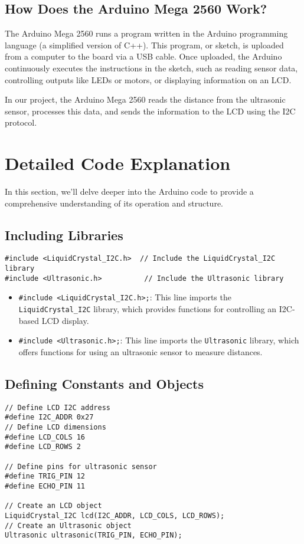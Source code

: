 \documentclass{article}
\begin{document}
\subsection{How Does the Arduino Mega 2560 Work?}
The Arduino Mega 2560 runs a program written in the Arduino programming language (a simplified version of C++). This program, or sketch, is uploaded from a computer to the board via a USB cable. Once uploaded, the Arduino continuously executes the instructions in the sketch, such as reading sensor data, controlling outputs like LEDs or motors, or displaying information on an LCD.

In our project, the Arduino Mega 2560 reads the distance from the ultrasonic sensor, processes this data, and sends the information to the LCD using the I2C protocol.
\section{Detailed Code Explanation}

In this section, we'll delve deeper into the Arduino code to provide a comprehensive understanding of its operation and structure.

\subsection{Including Libraries}

\begin{verbatim}
#include <LiquidCrystal_I2C.h>  // Include the LiquidCrystal_I2C library
#include <Ultrasonic.h>          // Include the Ultrasonic library
\end{verbatim}

\begin{itemize}
    \item \texttt{\#include <LiquidCrystal\_I2C.h>;}: This line imports the \texttt{LiquidCrystal\_I2C} library, which provides functions for controlling an I2C-based LCD display. 
    \item \texttt{\#include <Ultrasonic.h>;}: This line imports the \texttt{Ultrasonic} library, which offers functions for using an ultrasonic sensor to measure distances.
\end{itemize}

\subsection{Defining Constants and Objects}

\begin{verbatim}
// Define LCD I2C address
#define I2C_ADDR 0x27
// Define LCD dimensions
#define LCD_COLS 16
#define LCD_ROWS 2

// Define pins for ultrasonic sensor
#define TRIG_PIN 12
#define ECHO_PIN 11

// Create an LCD object
LiquidCrystal_I2C lcd(I2C_ADDR, LCD_COLS, LCD_ROWS);
// Create an Ultrasonic object
Ultrasonic ultrasonic(TRIG_PIN, ECHO_PIN);
\end{verbatim}
\end{document}
